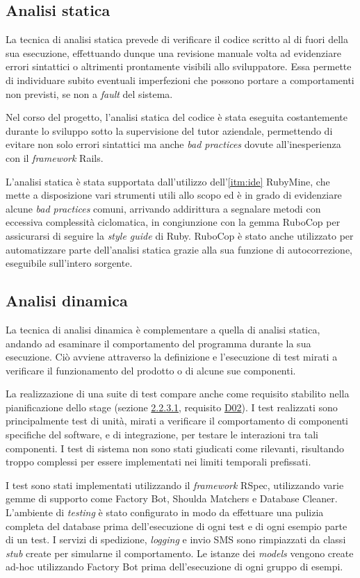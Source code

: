 \subsection{Analisi statica}
La tecnica di analisi statica prevede di verificare il codice scritto al di fuori della sua esecuzione, effettuando dunque una revisione manuale volta ad evidenziare errori sintattici o altrimenti prontamente visibili allo sviluppatore. Essa permette di individuare subito eventuali imperfezioni che possono portare a comportamenti non previsti, se non a \textit{fault} del sistema.

Nel corso del progetto, l'analisi statica del codice è stata eseguita costantemente durante lo sviluppo sotto la supervisione del tutor aziendale, permettendo di evitare non solo errori sintattici ma anche \textit{bad practices} dovute all'inesperienza con il \textit{framework} Rails.

L'analisi statica è stata supportata dall'utilizzo dell'\ref{itm:ide} RubyMine, che mette a disposizione vari strumenti utili allo scopo ed è in grado di evidenziare alcune \textit{bad practices} comuni, arrivando addirittura a segnalare metodi con eccessiva complessità ciclomatica, in congiunzione con la gemma RuboCop per assicurarsi di seguire la \textit{style guide} di Ruby. RuboCop è stato anche utilizzato per automatizzare parte dell'analisi statica grazie alla sua funzione di autocorrezione, eseguibile sull'intero sorgente.
\subsection{Analisi dinamica}
La tecnica di analisi dinamica è complementare a quella di analisi statica, andando ad esaminare il comportamento del programma durante la sua esecuzione. Ciò avviene attraverso la definizione e l'esecuzione di test mirati a verificare il funzionamento del prodotto o di alcune sue componenti.

La realizzazione di una suite di test compare anche come requisito stabilito nella pianificazione dello stage (sezione \hyperref[sec:reqs]{2.2.3.1}, requisito \underline{D02}). I test realizzati sono principalmente test di unità, mirati a verificare il comportamento di componenti specifiche del software, e di integrazione, per testare le interazioni tra tali componenti. I test di sistema non sono stati giudicati come rilevanti, risultando troppo complessi per essere implementati nei limiti temporali prefissati.

I test sono stati implementati utilizzando il \textit{framework} RSpec, utilizzando varie gemme di supporto come Factory Bot, Shoulda Matchers e Database Cleaner. L'ambiente di \textit{testing} è stato configurato in modo da effettuare una pulizia completa del database prima dell'esecuzione di ogni test e di ogni esempio parte di un test. I servizi di spedizione, \textit{logging} e invio SMS sono rimpiazzati da classi \textit{stub} create per simularne il comportamento. Le istanze dei \textit{models} vengono create ad-hoc utilizzando Factory Bot prima dell'esecuzione di ogni gruppo di esempi.


